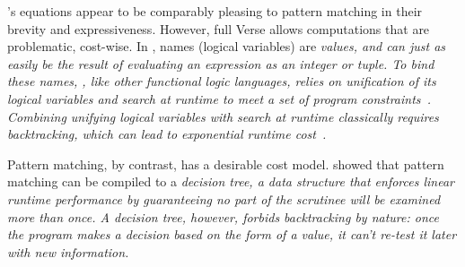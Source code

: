 \documentclass[manuscript,screen,review, 12pt, nonacm]{acmart}
\begin{document}
    \VC's equations appear to be comparably pleasing to pattern matching in
    their brevity and expressiveness. However, full Verse allows computations
    that are problematic, cost-wise. In \VC, names (logical variables) are
    \it{values}, and can just as easily be the result of evaluating an
    expression as an integer or tuple. To bind these names, \VC, like other
    functional logic languages, relies on \it{unification} of its logical
    variables and \it{search} at runtime to meet a set of program
    constraints~\citep{antoy2010functional, hanus2013functional}. Combining
    unifying logical variables with search at runtime classically requires
    backtracking, which can lead to exponential runtime
    cost~\citep{hanus2013functional, wadler1985replace, clark1982introduction}. 


    Pattern matching, by contrast, has a desirable cost model. \citet{maranget}
    showed that pattern matching can be compiled to a \it{decision tree}, a data
    structure that enforces linear runtime performance by guaranteeing no part
    of the scrutinee will be examined more than once. A decision tree, however,
    forbids backtracking by nature: once the program makes a decision based on
    the form of a value, it can't re-test it later with new information. 
    
\end{document}

